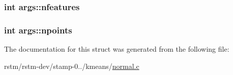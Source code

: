 \hypertarget{structargs_a796e94f2b850230a8fa07e7beca3172a}{
\subsubsection[{nfeatures}]{\setlength{\rightskip}{0pt plus 5cm}int args\-::nfeatures}}\label{structargs_a796e94f2b850230a8fa07e7beca3172a}
\hypertarget{structargs_a74b8722e5cdb753bda0d3ca8d790da59}{
\subsubsection[{npoints}]{\setlength{\rightskip}{0pt plus 5cm}int args\-::npoints}}\label{structargs_a74b8722e5cdb753bda0d3ca8d790da59}


The documentation for this struct was generated from the following file\-:\begin{DoxyCompactItemize}
\item 
rstm/rstm-\/dev/stamp-\/0../kmeans/\hyperlink{normal_8c}{normal.\-c}\end{DoxyCompactItemize}
